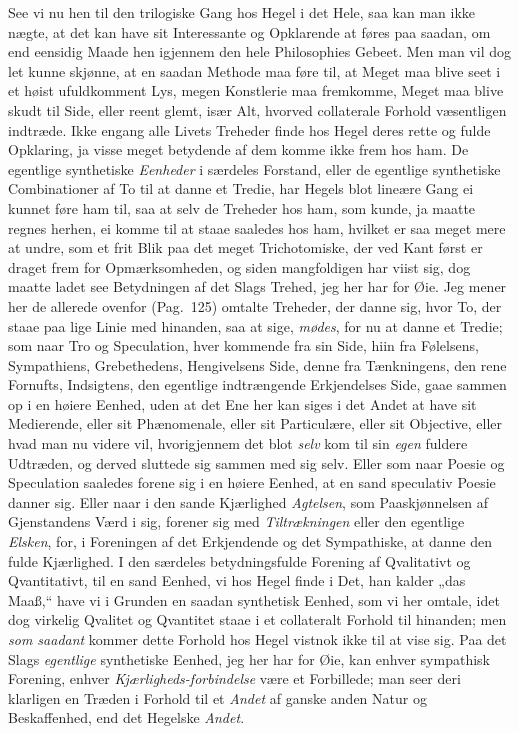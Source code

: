 \documentclass[12pt,a4paper]{book}
\newcommand{\apage}[1]{\marginnote{\footnotesize\textit{[#1]}}}
\begin{document}
%
See vi nu hen til den trilogiske Gang hos Hegel i det Hele, saa kan man ikke
nægte, at det kan have sit Interessante og Opklarende at føres paa saadan, om
end eensidig Maade hen igjennem den hele Philosophies Gebeet. Men man vil dog
let kunne skjønne, at en saadan Methode maa føre til, at Meget maa blive seet i
et høist ufuldkomment Lys, megen Konstlerie maa fremkomme, Meget maa blive
skudt til Side, eller reent glemt, især Alt, hvorved collaterale Forhold
væsentligen indtræde. Ikke engang alle Livets Treheder finde hos Hegel deres
rette og fulde Opklaring, ja visse meget betydende af dem komme ikke frem hos
ham. De egentlige synthetiske \emph{Eenheder} i særdeles Forstand, eller de egentlige
synthetiske Combinationer af To til at danne et Tredie, har Hegels blot lineære
Gang ei kunnet føre ham til, saa at selv de Treheder hos ham, som kunde, ja
maatte regnes herhen, ei komme til at staae saaledes hos ham, hvilket er saa
meget mere at undre, som et frit Blik paa det meget Trichotomiske, der ved Kant
først er draget frem for Opmærksomheden, og siden mangfoldigen har viist sig,
dog maatte ladet see Betydningen af det Slags Trehed, jeg her har for Øie. Jeg
mener her de allerede ovenfor (Pag.\ 125) omtalte Treheder, der danne sig, hvor
To, der staae paa lige Linie med hinanden, saa at sige, \emph{mødes}, for nu at danne
et Tredie; som naar Tro og Speculation, hver kommende fra sin Side, hiin fra
Følelsens, Sympathiens, Grebethedens, Hengivelsens Side, denne fra \apage{131} Tænkningens,
den rene Fornufts, Indsigtens, den egentlige indtrængende Erkjendelses Side,
gaae sammen op i en høiere Eenhed, uden at det Ene her kan siges i det Andet at
have sit Medierende, eller sit Phænomenale, eller sit Particulære, eller sit
Objective, eller hvad man nu videre vil, hvorigjennem det blot \emph{selv} kom til sin
\emph{egen} fuldere Udtræden, og derved sluttede sig sammen med sig selv. Eller som
naar Poesie og Speculation saaledes forene sig i en høiere Eenhed, at en sand
speculativ Poesie danner sig. Eller naar i den sande Kjærlighed \emph{Agtelsen}, som
Paaskjønnelsen af Gjenstandens Værd i sig, forener sig med \emph{Tiltrækningen} eller
den egentlige \emph{Elsken}, for, i Foreningen af det Erkjendende og det Sympathiske,
at danne den fulde Kjærlighed. I den særdeles betydningsfulde Forening af
Qvalitativt og Qvantitativt, til en sand Eenhed, vi hos Hegel finde i Det, han
kalder „das Maaß,“ have vi i Grunden en saadan synthetisk Eenhed, som vi her
omtale, idet dog virkelig Qvalitet og Qvantitet staae i et collateralt Forhold
til hinanden; men \emph{som saadant} kommer dette Forhold hos Hegel vistnok ikke til
at vise sig. Paa det Slags \emph{egentlige} synthetiske Eenhed, jeg her har for Øie,
kan enhver sympathisk Forening, enhver \emph{Kjærligheds-forbindelse} være et
Forbillede; man seer deri klarligen en Træden i Forhold til et \emph{Andet} af ganske
anden Natur og Beskaffenhed, end det Hegelske \emph{Andet}.
\end{document}

